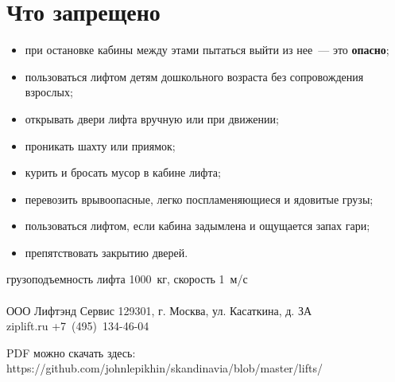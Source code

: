 \documentclass[10pt, a4paper]{article}
\begin{document}
\section*{Что запрещено}

\begin{itemize}
  \item при остановке кабины между этами пытаться выйти из нее~--- это \textbf{опасно};
  \item пользоваться лифтом детям дошкольного возраста без сопровождения взрослых;
  \item открывать двери лифта вручную или при движении;
  \item проникать шахту или приямок;
  \item курить и бросать мусор в кабине лифта;
  \item перевозить врывоопасные, легко поспламеняющиеся и ядовитые грузы;
  \item пользоваться лифтом, если кабина задымлена и ощущается запах гари;
  \item препятствовать закрытию дверей.
\end{itemize}

\small{
  \noindent
  \mbox{}\hfill грузоподъемность лифта 1000~кг, скорость 1~м/с\\
  \\
  \mbox{}\hfill ООО Лифтэнд Сервис 129301, г. Москва, ул. Касаткина, д. ЗА\\
  \mbox{}\hfill ziplift.ru +7~(495)~134-46-04
}

\vspace*{\fill}
\tiny{
  \mbox{}\hfill PDF можно скачать здесь: https://github.com/johnlepikhin/skandinavia/blob/master/lifts/
}
\end{document}
